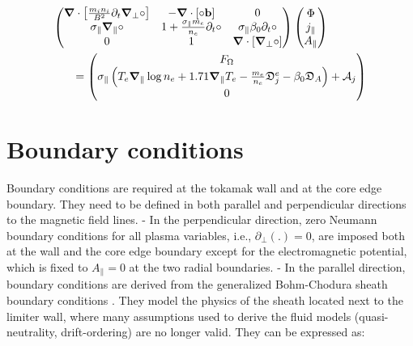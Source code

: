 \begin{align}
	\makebox[0.8\textwidth][l]{$\displaystyle
		\begin{pmatrix}
			\grad\cdot\left[\frac{m_i n_i}{ B^2}\partial_t\grad_\perp\circ\right] & 
			- \grad\cdot\left[\circ\mathbf{b}\right] & 
			0 \\
			\sigma_\parallel\grad_\parallel\circ &
			1 + \frac{\sigma_\parallel m_e}{n_e}\partial_t \circ &
			\sigma_\parallel\beta_0\partial_t\circ \\
			0 & 1 & \grad\cdot\left[\grad_\perp\circ\right]
		\end{pmatrix}
		\begin{pmatrix}
			\Phi \\ j_\parallel \\ A_\parallel
		\end{pmatrix}
	$} \nonumber \\	
	\makebox[0.8\textwidth][r]{$\displaystyle
		= \begin{pmatrix}
			F_\Omega \\
			\sigma_\parallel\left(T_e\grad_\parallel\log n_e + 1.71\grad_\parallel T_e - \frac{m_e}{n_e}\mathfrak{D}_j^e - \beta_0\mathfrak{D}_A \right) + \mathcal{A}_j \\
			0
		\end{pmatrix}
	$} \label{eq:S3X_vorticityEquation_ElectronInertiaElectromagnetism_matrix}
\end{align}

\section{Boundary conditions}
\label{sec:S3X_boundaryConditions}

Boundary conditions are required at the tokamak wall and at the core edge boundary. They need to be defined in both parallel and perpendicular directions to the magnetic field lines. \newline
- In the perpendicular direction, zero Neumann boundary conditions for all plasma variables, i.e., $\partial_{\perp} (.)=0$, are imposed both at the wall and the core edge boundary except for the electromagnetic potential, which is fixed to $A_\parallel=0$ at the two radial boundaries. \newline
- In the parallel direction, boundary conditions are derived from the generalized Bohm-Chodura sheath boundary conditions \cite{Stangeby_2000}. They model the physics of the sheath located next to the limiter wall, where many assumptions used to derive the fluid models (quasi-neutrality, drift-ordering) are no longer valid. They can be expressed as: \newline

